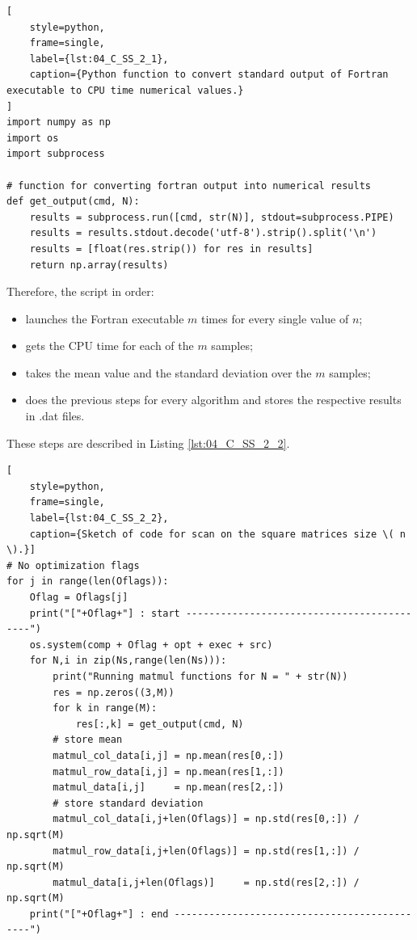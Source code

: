 \documentclass[pra, onecolumn, notitlepage, floats, 11pt]{revtex4-1}
\begin{document}
\medskip
\begin{lstlisting}[
    style=python,
    frame=single,
    label={lst:04_C_SS_2_1},
    caption={Python function to convert standard output of Fortran executable to CPU time numerical values.}
]
import numpy as np
import os
import subprocess

# function for converting fortran output into numerical results
def get_output(cmd, N):
    results = subprocess.run([cmd, str(N)], stdout=subprocess.PIPE)
    results = results.stdout.decode('utf-8').strip().split('\n')
    results = [float(res.strip()) for res in results]
    return np.array(results)
\end{lstlisting}

Therefore, the script in order:
\begin{itemize}
    \item launches the Fortran executable \( m \) times for every single value of \( n \);
    \item gets the CPU time for each of the \( m \) samples;
    \item takes the mean value and the standard deviation over the \( m \) samples;
    \item does the previous steps for every algorithm and stores the respective results in .dat files.
\end{itemize}
These steps are described in Listing \ref{lst:04_C_SS_2_2}.

\medskip
\begin{lstlisting}[
    style=python,
    frame=single,
    label={lst:04_C_SS_2_2},
    caption={Sketch of code for scan on the square matrices size \( n \).}]
# No optimization flags
for j in range(len(Oflags)):
    Oflag = Oflags[j]
    print("["+Oflag+"] : start -------------------------------------------")
    os.system(comp + Oflag + opt + exec + src)
    for N,i in zip(Ns,range(len(Ns))):
        print("Running matmul functions for N = " + str(N))
        res = np.zeros((3,M))
        for k in range(M):
            res[:,k] = get_output(cmd, N)
        # store mean
        matmul_col_data[i,j] = np.mean(res[0,:])
        matmul_row_data[i,j] = np.mean(res[1,:])
        matmul_data[i,j]     = np.mean(res[2,:])
        # store standard deviation
        matmul_col_data[i,j+len(Oflags)] = np.std(res[0,:]) / np.sqrt(M)
        matmul_row_data[i,j+len(Oflags)] = np.std(res[1,:]) / np.sqrt(M)
        matmul_data[i,j+len(Oflags)]     = np.std(res[2,:]) / np.sqrt(M)
    print("["+Oflag+"] : end ---------------------------------------------")
\end{lstlisting}
\end{document}
